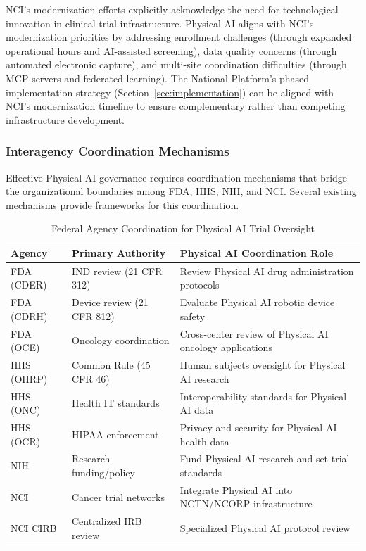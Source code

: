 NCI's modernization efforts \cite{nci-modernizing} explicitly acknowledge the
need for technological innovation in clinical trial infrastructure. Physical
AI aligns with NCI's modernization priorities by addressing enrollment
challenges (through expanded operational hours and AI-assisted screening),
data quality concerns (through automated electronic capture), and multi-site
coordination difficulties (through MCP servers and federated learning). The
National Platform's phased implementation strategy
(Section~\ref{sec:implementation}) can be aligned with NCI's modernization
timeline to ensure complementary rather than competing infrastructure
development.

\subsubsection{Interagency Coordination Mechanisms}

Effective Physical AI governance requires coordination mechanisms that bridge
the organizational boundaries among FDA, HHS, NIH, and NCI. Several existing
mechanisms provide frameworks for this coordination.

\begin{table}[H]
\centering
\caption{Federal Agency Coordination for Physical AI Trial Oversight}
\label{tab:agency-coordination}
\small
\begin{tabularx}{\textwidth}{l l X}
\toprule
\textbf{Agency} & \textbf{Primary Authority} & \textbf{Physical AI Coordination Role} \\
\midrule
FDA (CDER) & IND review (21 CFR 312) & Review Physical AI drug administration protocols \\
FDA (CDRH) & Device review (21 CFR 812) & Evaluate Physical AI robotic device safety \\
FDA (OCE) & Oncology coordination & Cross-center review of Physical AI oncology applications \\
HHS (OHRP) & Common Rule (45 CFR 46) & Human subjects oversight for Physical AI research \\
HHS (ONC) & Health IT standards & Interoperability standards for Physical AI data \\
HHS (OCR) & HIPAA enforcement & Privacy and security for Physical AI health data \\
NIH & Research funding/policy & Fund Physical AI research and set trial standards \\
NCI & Cancer trial networks & Integrate Physical AI into NCTN/NCORP infrastructure \\
NCI CIRB & Centralized IRB review & Specialized Physical AI protocol review \\
\bottomrule
\end{tabularx}
\end{table}

